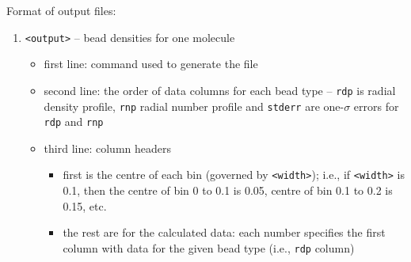 \noindent
Format of output files:
\begin{enumerate}[nosep,leftmargin=20pt]
  \item \texttt{<output>} -- bead densities for one molecule
    \begin{itemize}[nosep,leftmargin=5pt]
      \item first line: command used to generate the file
      \item second line: the order of data columns for each bead type --
        \texttt{rdp} is radial density profile, \texttt{rnp} radial number
        profile and \texttt{stderr} are one-$\sigma$ errors for \texttt{rdp}
        and \texttt{rnp}
      \item third line: column headers
        \begin{itemize}[nosep,leftmargin=10pt]
          \item first is the centre of each bin (governed by
            \texttt{<width>}); i.e., if \texttt{<width>} is 0.1,
            then the centre of bin 0 to 0.1 is 0.05, centre of bin 0.1 to
            0.2 is 0.15, etc.
          \item the rest are for the calculated data: each number specifies
            the first column with data for the given bead type (i.e.,
            \texttt{rdp} column)
        \end{itemize}
    \end{itemize}
\end{enumerate}

